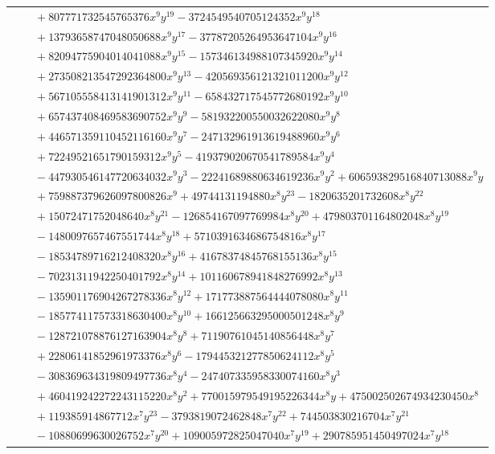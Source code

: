 \documentclass[11pt]{article}
\begin{document}
\begin{longtable}{@{}ll@{}}
 & $\quad +807771732545765376x^{9}y^{19}-3724549540705124352x^{9}y^{18}$\\
 & $\quad +13793658747048050688x^{9}y^{17}-37787205264953647104x^{9}y^{16}$\\
 & $\quad +82094775904014041088x^{9}y^{15}-157346134988107345920x^{9}y^{14}$\\
 & $\quad +273508213547292364800x^{9}y^{13}-420569356121321011200x^{9}y^{12}$\\
 & $\quad +567105558413141901312x^{9}y^{11}-658432717545772680192x^{9}y^{10}$\\
 & $\quad +657437408469583690752x^{9}y^{9}-581932200550032622080x^{9}y^{8}$\\
 & $\quad +446571359110452116160x^{9}y^{7}-247132961913619488960x^{9}y^{6}$\\
 & $\quad +72249521651790159312x^{9}y^{5}-419379020670541789584x^{9}y^{4}$\\
 & $\quad -447930546147720634032x^{9}y^{3}-22241689880634619236x^{9}y^{2}+606593829516840713088x^{9}y$\\
 & $\quad +759887379626097800826x^{9}+49744131194880x^{8}y^{23}-1820635201732608x^{8}y^{22}$\\
 & $\quad +15072471752048640x^{8}y^{21}-126854167097769984x^{8}y^{20}+479803701164802048x^{8}y^{19}$\\
 & $\quad -1480097657467551744x^{8}y^{18}+5710391634686754816x^{8}y^{17}$\\
 & $\quad -18534789716212408320x^{8}y^{16}+41678374845768155136x^{8}y^{15}$\\
 & $\quad -70231311942250401792x^{8}y^{14}+101160678941848276992x^{8}y^{13}$\\
 & $\quad -135901176904267278336x^{8}y^{12}+171773887564444078080x^{8}y^{11}$\\
 & $\quad -185774117573318630400x^{8}y^{10}+166125663295000501248x^{8}y^{9}$\\
 & $\quad -128721078876127163904x^{8}y^{8}+71190761045140856448x^{8}y^{7}$\\
 & $\quad +22806141852961973376x^{8}y^{6}-179445321277850624112x^{8}y^{5}$\\
 & $\quad -308369634319809497736x^{8}y^{4}-247407335958330074160x^{8}y^{3}$\\
 & $\quad +460419242272243115220x^{8}y^{2}+770015979549195226344x^{8}y+475002502674934230450x^{8}$\\
 & $\quad +119385914867712x^{7}y^{23}-3793819072462848x^{7}y^{22}+744503830216704x^{7}y^{21}$\\
 & $\quad -10880699630026752x^{7}y^{20}+109005972825047040x^{7}y^{19}+290785951450497024x^{7}y^{18}$\\

\end{longtable}
\end{document}
